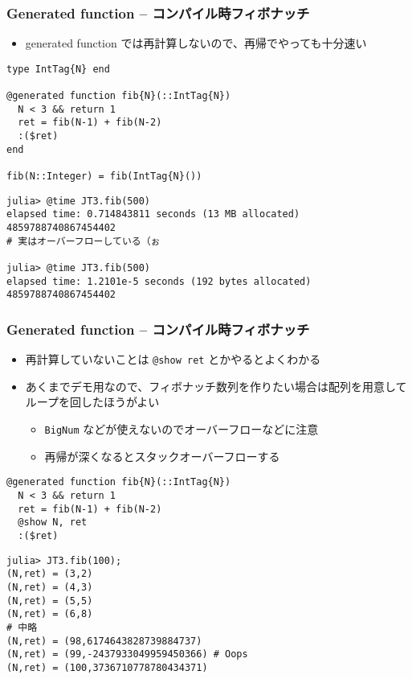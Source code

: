 \begin{frame}
\frametitle{Generated function -- コンパイル時フィボナッチ}
\begin{itemize}
  \item generated function では再計算しないので、再帰でやっても十分速い
\end{itemize}
\begin{lstlisting}
type IntTag{N} end

@generated function fib{N}(::IntTag{N})
  N < 3 && return 1
  ret = fib(N-1) + fib(N-2)
  :($ret)
end

fib(N::Integer) = fib(IntTag{N}())
\end{lstlisting}
\begin{lstlisting}
julia> @time JT3.fib(500)
elapsed time: 0.714843811 seconds (13 MB allocated)
4859788740867454402
# 実はオーバーフローしている（ぉ

julia> @time JT3.fib(500)
elapsed time: 1.2101e-5 seconds (192 bytes allocated)
4859788740867454402
\end{lstlisting}
\end{frame}

\begin{frame}
\frametitle{Generated function -- コンパイル時フィボナッチ}
\begin{itemize}
  \item 再計算していないことは \verb|@show ret| とかやるとよくわかる
  \item あくまでデモ用なので、フィボナッチ数列を作りたい場合は配列を用意してループを回したほうがよい
  \begin{itemize}
    \item \verb|BigNum| などが使えないのでオーバーフローなどに注意
    \item 再帰が深くなるとスタックオーバーフローする
  \end{itemize}
\end{itemize}
\begin{lstlisting}
@generated function fib{N}(::IntTag{N})
  N < 3 && return 1
  ret = fib(N-1) + fib(N-2)
  @show N, ret
  :($ret)
\end{lstlisting}
\begin{lstlisting}
julia> JT3.fib(100);
(N,ret) = (3,2)
(N,ret) = (4,3)
(N,ret) = (5,5)
(N,ret) = (6,8)
# 中略
(N,ret) = (98,6174643828739884737)
(N,ret) = (99,-2437933049959450366) # Oops
(N,ret) = (100,3736710778780434371)
\end{lstlisting}
\end{frame}

